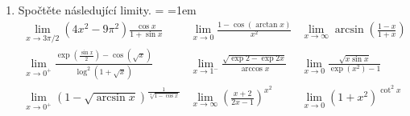 \section*{}
\begin{enumerate}
 \item Spočtěte následující limity.
  {\everymath={\displaystyle}
   \arraycolsep=1em
   \[
    \begin{array}{lll}
     \lim_{x \to 3 \pi / 2} (4x^2 - 9\pi^2) \frac{\cos x}{1 + \sin x} & \lim_{x
     \to 0} \frac{1 - \cos(\arctan x)}{x^2} & \lim_{x \to \infty} \arcsin \left(
     \frac{1-x}{1+x}\right)\\[2em]
     \lim_{x \to 0^{+}} \frac{\exp \left( \frac{\sin x}{2} \right) - \cos
     (\sqrt{x})}{\log^2(1 + \sqrt{x})} & \lim_{x \to 1^{-}} \frac{\sqrt{\exp 2 -
    \exp 2x}}{\arccos x} & \lim_{x \to 0} \frac{\sqrt{x \sin x}}{\exp(x^2) -
    1}\\[2em]
    \lim_{x \to 0^{+}} \left( 1 - \sqrt{\arcsin x} \right)^{\frac{1}{\sqrt[4]{1 -
  \cos x}}} & \lim_{x \to \infty} \left( \frac{x+2}{2x-1} \right)^{x^2} & \lim_{x
  \to 0} (1 + x^2)^{\cot^2 x}
    \end{array}
   \]
  }
\end{enumerate}

